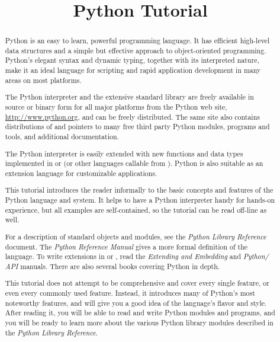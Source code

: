 \documentclass{manual}
\title{Python Tutorial}
\begin{document}
\maketitle



\begin{abstract}

\noindent
Python is an easy to learn, powerful programming language.  It has
efficient high-level data structures and a simple but effective
approach to object-oriented programming.  Python's elegant syntax and
dynamic typing, together with its interpreted nature, make it an ideal 
language for scripting and rapid application development in many areas 
on most platforms.

The Python interpreter and the extensive standard library are freely
available in source or binary form for all major platforms from the
Python web site, \url{http://www.python.org}, and can be freely
distributed.  The same site also contains distributions of and
pointers to many free third party Python modules, programs and tools,
and additional documentation.

The Python interpreter is easily extended with new functions and data
types implemented in \C{} or \Cpp{} (or other languages callable from \C{}).
Python is also suitable as an extension language for customizable
applications.

This tutorial introduces the reader informally to the basic concepts
and features of the Python language and system.  It helps to have a
Python interpreter handy for hands-on experience, but all examples are
self-contained, so the tutorial can be read off-line as well.

For a description of standard objects and modules, see the
\emph{Python Library Reference} document.  The \emph{Python Reference
Manual} gives a more formal definition of the language.  To write
extensions in \C{} or \Cpp{}, read the \emph{Extending and Embedding} and
\emph{Python/\C{} API} manuals.  There are also several books covering
Python in depth.

This tutorial does not attempt to be comprehensive and cover every
single feature, or even every commonly used feature.  Instead, it
introduces many of Python's most noteworthy features, and will give
you a good idea of the language's flavor and style.  After reading it,
you will be able to read and write Python modules and programs, and
you will be ready to learn more about the various Python library
modules described in the \emph{Python Library Reference}.

\end{abstract}
\end{document}
